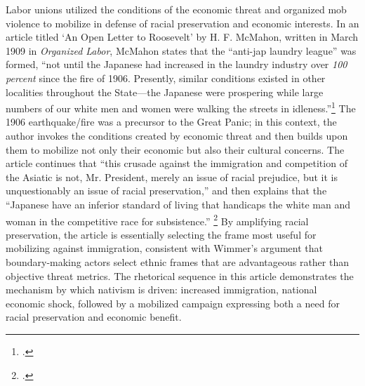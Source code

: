 \documentclass[12pt,a4paper]{article}
\begin{document}
Labor unions utilized the conditions of the economic threat and organized mob violence to mobilize in defense of racial preservation and economic interests. In an article titled `An Open Letter to Roosevelt' by H. F. McMahon, written in March 1909 in \textit{Organized Labor}, McMahon states that the ``anti-jap laundry league'' was formed, ``not until the Japanese had increased in the laundry industry over \textit{100 percent} since the fire of 1906. Presently, similar conditions existed in other localities throughout the State---the Japanese were prospering while large numbers of our white men and women were walking the streets in idleness.''\footcite{mcmahon_open_1909} The 1906 earthquake/fire was a precursor to the Great Panic; in this context, the author invokes the conditions created by economic threat and then builds upon them to mobilize not only their economic but also their cultural concerns. The article continues that ``this crusade against the immigration and competition of the Asiatic is not, Mr. President, merely an issue of racial prejudice, but it is unquestionably an issue of racial preservation,'' and then explains that the ``Japanese have an inferior standard of living that handicaps the white man and woman in the competitive race for subsistence.'' \footcite{mcmahon_open_1909} By amplifying racial preservation, the article is essentially selecting the frame most useful for mobilizing against immigration, consistent with Wimmer's argument that boundary-making actors select ethnic frames that are advantageous rather than objective threat metrics. The rhetorical sequence in this article demonstrates the mechanism by which nativism is driven: increased immigration, national economic shock, followed by a mobilized campaign expressing both a need for racial preservation and economic benefit.
\end{document}

